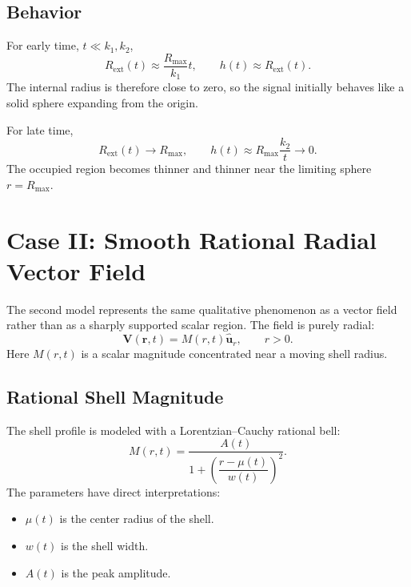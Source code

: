 \documentclass[a4paper,12pt]{article}
\begin{document}
\subsection{Behavior}

For early time, \(t\ll k_1,k_2\),
\[
    R_{\mathrm{ext}}(t)
    \approx
    \frac{R_{\max}}{k_1}t,
    \qquad
    h(t)\approx R_{\mathrm{ext}}(t).
\]
The internal radius is therefore close to zero, so the signal initially behaves
like a solid sphere expanding from the origin.

For late time,
\[
    R_{\mathrm{ext}}(t)\to R_{\max},
    \qquad
    h(t)\approx R_{\max}\frac{k_2}{t}\to 0.
\]
The occupied region becomes thinner and thinner near the limiting sphere
\(r=R_{\max}\).

\section{Case II: Smooth Rational Radial Vector Field}

The second model represents the same qualitative phenomenon as a vector field
rather than as a sharply supported scalar region. The field is purely radial:
\begin{equation}
    \bm{V}(\bm{r},t)
    =
    M(r,t)\hat{\bm{u}}_r,
    \qquad r>0.
    \label{eq:vector-field-general}
\end{equation}
Here \(M(r,t)\) is a scalar magnitude concentrated near a moving shell radius.

\subsection{Rational Shell Magnitude}

The shell profile is modeled with a Lorentzian--Cauchy rational bell:
\begin{equation}
    M(r,t)
    =
    \frac{A(t)}
    {1+\left(\dfrac{r-\mu(t)}{w(t)}\right)^2}.
    \label{eq:lorentzian-magnitude}
\end{equation}
The parameters have direct interpretations:
\begin{itemize}
    \item \(\mu(t)\) is the center radius of the shell.
    \item \(w(t)\) is the shell width.
    \item \(A(t)\) is the peak amplitude.
\end{itemize}
\end{document}
